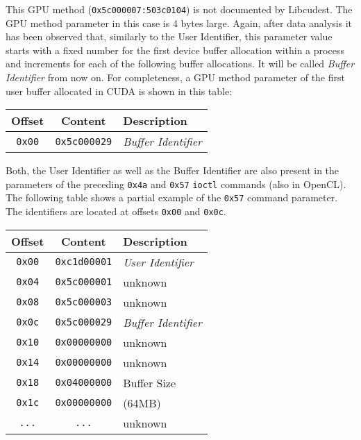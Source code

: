 This GPU method (\texttt{0x5c000007:503c0104}) is not documented by Libcudest.
The GPU method parameter in this case is 4 bytes large.
Again, after data analysis it has been observed that, similarly to the User Identifier, this parameter value starts with a fixed number for the first device buffer allocation within a process and increments for each of the following buffer allocations.
It will be called \emph{Buffer Identifier} from now on.
For completeness, a GPU method parameter of the first user buffer allocated in CUDA is shown in this table:
\begin{center}
\begin{tabular}{| c | c | l |}
	\hline
	Offset & Content & Description \\
	\hline
	\hline
	\texttt{0x00} & \texttt{0x5c000029} & \emph{Buffer Identifier} \\
	\hline
\end{tabular}
\end{center}


Both, the User Identifier as well as the Buffer Identifier are also present in the parameters of the preceding \texttt{0x4a} and \texttt{0x57} \texttt{ioctl} commands (also in OpenCL).
The following table shows a partial example of the \texttt{0x57} command parameter.
The identifiers are located at offsets \texttt{0x00} and \texttt{0x0c}.



\begin{center}
\begin{tabular}{| c | c | l |}
	\hline
	Offset & Content & Description \\
	\hline
	\hline
	\texttt{0x00} & \texttt{0xc1d00001} & \emph{User Identifier} \\
	\hline
	\texttt{0x04} & \texttt{0x5c000001} & {unknown} \\
	\hline
	\texttt{0x08} & \texttt{0x5c000003} & {unknown} \\
	\hline
	\texttt{0x0c} & \texttt{0x5c000029} & \emph{Buffer Identifier} \\
	\hline
	\texttt{0x10} & \texttt{0x00000000} & {unknown} \\
	\hline
	\texttt{0x14} & \texttt{0x00000000} & {unknown} \\
	\hline
	\texttt{0x18} & \texttt{0x04000000} & Buffer Size \\
	\texttt{0x1c} & \texttt{0x00000000} & (64MB) \\
	\hline
	\texttt{...} & \texttt{...} & {unknown} \\
	\hline
\end{tabular}
\end{center}


